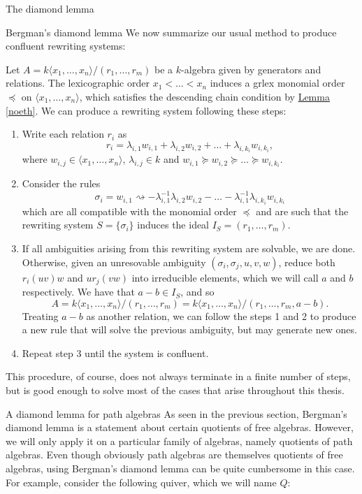 \begin{chapter}{The diamond lemma}
\begin{section}{Bergman's diamond lemma}
We now summarize our usual method to produce confluent rewriting systems:

\begin{heur}\label{heuristic} Let $A=k\langle x_1,\dots,x_n\rangle/(r_1,\dots,r_m)$ be a $k$-algebra given by generators and relations. The lexicographic order $x_1<\dots<x_n$ induces a grlex monomial order $\preceq$ on $\langle x_1,\dots,x_n\rangle$, which satisfies the descending chain condition by \hyperref[noeth]{Lemma \ref*{noeth}}. We can produce a rewriting system following these steps:
\begin{enumerate}
\item Write each relation $r_i$ as
\[r_i = \lambda_{i,1}w_{i,1} + \lambda_{i,2} w_{i,2} + \dots + \lambda_{i,k_i} w_{i, k_i},\]
where $w_{i,j}\in \langle x_1,\dots,x_n\rangle$, $\lambda_{i,j}\in k$ and $w_{i,1}\succeq w_{i,2}\succeq\dots\succeq w_{i,k_i}$.
\item Consider the rules
\[\sigma_i = w_{i,1} \rightsquigarrow -\lambda_{i,1}^{-1}\lambda_{i,2}w_{i,2}-\dots-\lambda_{i,1}^{-1}\lambda_{i,k_i}w_{i,k_i}\]
which are all compatible with the monomial order $\preceq$ and are such that the rewriting system $S=\{\sigma_i\}$ induces the ideal $I_S=(r_1,\dots,r_m)$.
\item If all ambiguities arising from this rewriting system are solvable, we are done. Otherwise, given an unresovable ambiguity $(\sigma_i, \sigma_j, u,v,w)$, reduce both $r_i(uv)w$ and $ur_j(vw)$ into irreducible elements, which we will call $a$ and $b$ respectively. We have that $a-b\in I_S$, and so \[A=k\langle x_1,\dots,x_n\rangle/(r_1,\dots,r_m)=k\langle x_1,\dots,x_n\rangle/(r_1,\dots,r_m, a-b).\]
Treating $a-b$ as another relation, we can follow the steps 1 and 2 to produce a new rule that will solve the previous ambiguity, but may generate new ones.
\item Repeat step 3 until the system is confluent.
\end{enumerate}
This procedure, of course, does not always terminate in a finite number of steps, but is good enough to solve most of the cases that arise throughout this thesis.
\end{heur}
\end{section}
\begin{section}{A diamond lemma for path algebras}
\label{path-diamond}
As seen in the previous section, Bergman's diamond lemma is a statement about certain quotients of free algebras. However, we will only apply it on a particular family of algebras, namely quotients of path algebras. Even though obviously path algebras are themselves quotients of free algebras, using Bergman's diamond lemma can be quite cumbersome in this case. For example, consider the following quiver, which we will name $Q$:

\end{section}
\end{chapter}
